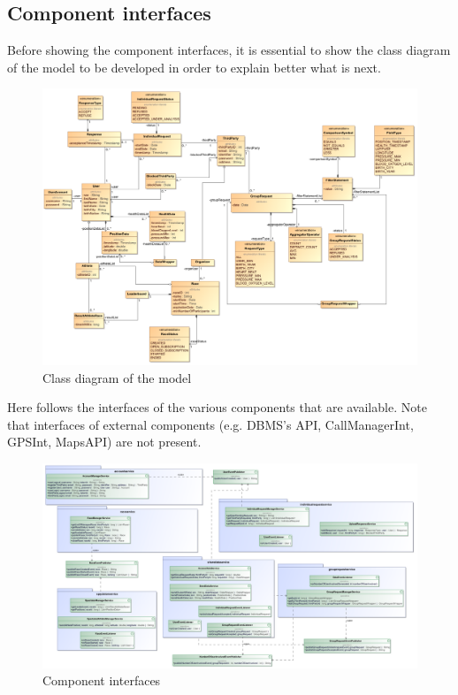 \subsection{Component interfaces}
Before showing the component interfaces, it is essential to show the class diagram of the model to be developed in order to
explain better what is next.

\begin{figure}[H]
\includegraphics[width=\linewidth]{Images/classdiagram.pdf}
\caption{ Class diagram of the model }
\label{fig:classdiagram}
\end{figure}

Here follows the interfaces of the various components that are available. 
Note that interfaces of external components (e.g. DBMS's API, CallManagerInt, GPSInt, MapsAPI) are not present. 

\begin{figure}[H]
\includegraphics[width=\linewidth]{Images/componentinterfaces.pdf}
\caption{ Component interfaces }
\label{fig:componentinterface}
\end{figure}


